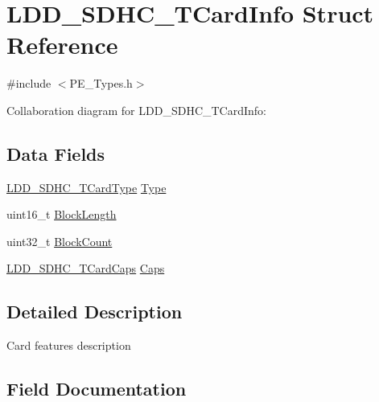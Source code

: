 \hypertarget{struct_l_d_d___s_d_h_c___t_card_info}{}\section{L\+D\+D\+\_\+\+S\+D\+H\+C\+\_\+\+T\+Card\+Info Struct Reference}
\label{struct_l_d_d___s_d_h_c___t_card_info}


{\ttfamily \#include $<$P\+E\+\_\+\+Types.\+h$>$}



Collaboration diagram for L\+D\+D\+\_\+\+S\+D\+H\+C\+\_\+\+T\+Card\+Info\+:
\subsection*{Data Fields}
\begin{DoxyCompactItemize}
\item 
\hyperlink{group___p_e___types__module_ga5344ded013ca3da273ed4f52c9c96fc7}{L\+D\+D\+\_\+\+S\+D\+H\+C\+\_\+\+T\+Card\+Type} \hyperlink{struct_l_d_d___s_d_h_c___t_card_info_af74fa6aeb8c59c7fff7bc543ac714f9c}{Type}
\item 
uint16\+\_\+t \hyperlink{struct_l_d_d___s_d_h_c___t_card_info_a344d6d32d64c219e239fc8f82d9a2e35}{Block\+Length}
\item 
uint32\+\_\+t \hyperlink{struct_l_d_d___s_d_h_c___t_card_info_a1ef0815a72f7fb693a902e4a737a13c9}{Block\+Count}
\item 
\hyperlink{struct_l_d_d___s_d_h_c___t_card_caps}{L\+D\+D\+\_\+\+S\+D\+H\+C\+\_\+\+T\+Card\+Caps} \hyperlink{struct_l_d_d___s_d_h_c___t_card_info_ac2410f9a175b43777b0bddfc1b8346d1}{Caps}
\end{DoxyCompactItemize}


\subsection{Detailed Description}
Card features description 

\subsection{Field Documentation}
\mbox{\label{struct_l_d_d___s_d_h_c___t_card_info_a1ef0815a72f7fb693a902e4a737a13c9}} 
